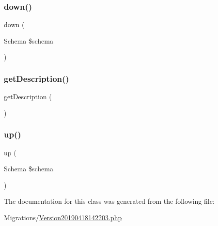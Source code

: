 \subsubsection{\texorpdfstring{down()}{down()}}
{\footnotesize\ttfamily down (\begin{DoxyParamCaption}\item[{Schema}]{\$schema }\end{DoxyParamCaption})}

\mbox{\label{class_doctrine_migrations_1_1_version20190418142203_a2e7bb35c71bf1824456ceb944cb7a845}} 
\subsubsection{\texorpdfstring{getDescription()}{getDescription()}}
{\footnotesize\ttfamily get\+Description (\begin{DoxyParamCaption}{ }\end{DoxyParamCaption})}

\mbox{\label{class_doctrine_migrations_1_1_version20190418142203_a23eb1c1428e8ea2ab2cf798fc06ec421}} 
\subsubsection{\texorpdfstring{up()}{up()}}
{\footnotesize\ttfamily up (\begin{DoxyParamCaption}\item[{Schema}]{\$schema }\end{DoxyParamCaption})}



The documentation for this class was generated from the following file\+:\begin{DoxyCompactItemize}
\item 
Migrations/\mbox{\hyperlink{_version20190418142203_8php}{Version20190418142203.\+php}}\end{DoxyCompactItemize}
